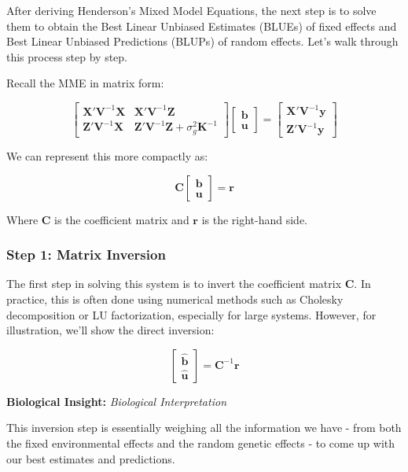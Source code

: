 \documentclass[12pt,a4paper]{article}
\newenvironment{biologicalinsightbox}[1][]
{\begin{basebox}[linecolor=uqpurple]
\textbf{\color{uqpurple}Biological Insight:} \textit{#1}\par\noindent\ignorespaces}
{\end{basebox}}
\begin{document}
After deriving Henderson's Mixed Model Equations, the next step is to solve them to obtain the Best Linear Unbiased Estimates (BLUEs) of fixed effects and Best Linear Unbiased Predictions (BLUPs) of random effects. Let's walk through this process step by step.

Recall the MME in matrix form:

\[
\begin{bmatrix}
    \mathbf{X'} \mathbf{V}^{-1} \mathbf{X} & \mathbf{X'} \mathbf{V}^{-1} \mathbf{Z} \\
    \mathbf{Z'} \mathbf{V}^{-1} \mathbf{X} & \mathbf{Z'} \mathbf{V}^{-1} \mathbf{Z} + \sigma^2_g \mathbf{K}^{-1}
\end{bmatrix}
\begin{bmatrix}
    \mathbf{b} \\
    \mathbf{u}
\end{bmatrix}
=
\begin{bmatrix}
    \mathbf{X'} \mathbf{V}^{-1} \mathbf{y} \\
    \mathbf{Z'} \mathbf{V}^{-1} \mathbf{y}
\end{bmatrix}
\]

We can represent this more compactly as:

\[
\mathbf{C} \begin{bmatrix} \mathbf{b} \\ \mathbf{u} \end{bmatrix} = \mathbf{r}
\]

Where $\mathbf{C}$ is the coefficient matrix and $\mathbf{r}$ is the right-hand side.

\subsubsection{Step 1: Matrix Inversion}

The first step in solving this system is to invert the coefficient matrix $\mathbf{C}$. In practice, this is often done using numerical methods such as Cholesky decomposition or LU factorization, especially for large systems. However, for illustration, we'll show the direct inversion:

\[
\begin{bmatrix} \hat{\mathbf{b}} \\ \hat{\mathbf{u}} \end{bmatrix} = \mathbf{C}^{-1} \mathbf{r}
\]

\begin{biologicalinsightbox}[Biological Interpretation]

This inversion step is essentially weighing all the information we have - from both the fixed environmental effects and the random genetic effects - to come up with our best estimates and predictions.
\end{biologicalinsightbox}
\end{document}
